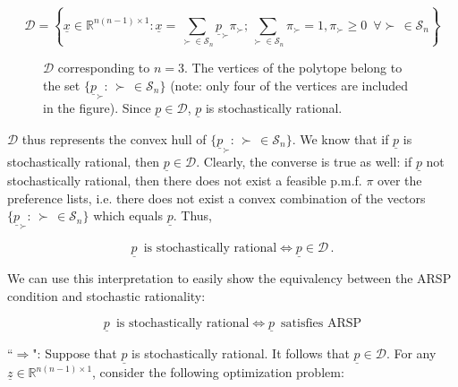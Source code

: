 \documentclass[11pt]{article}
\begin{document}
\begin{equation*}
\mathcal{D} = \left \{ \underline{x} \in \mathbb{R}^{n(n-1) \times 1} : \underline{x} = \sum_{\succ \in \mathcal{S}_n}\underline{p}_{\succ}  \pi_{\succ} ; \sum_{\succ \in \mathcal{S}_n} \pi_{\succ} = 1, \pi_{\succ} \geq 0 \, \, \, \forall  \succ \, \in \mathcal{S}_n \right \}
\end{equation*}

\begin{center}
\begin{figure}[h]
	\caption{$\mathcal{D}$ corresponding to $n=3$. The vertices of the polytope belong to the set $\{\underline{p}_{\succ} : \, \succ \, \in \mathcal{S}_n\}$ (note: only four of the vertices are included in the figure). Since $\underline{p} \in \mathcal{D}$, $\underline{p}$ is stochastically rational.}
\end{figure}
\end{center}



$\mathcal{D}$ thus represents the convex hull of  $\{\underline{p}_{\succ} : \, \succ \, \in \mathcal{S}_n\}$. We know that if $\underline{p}$ is stochastically rational, then $\underline{p} \in \mathcal{D}$. Clearly, the converse is true as well: if $\underline{p}$ not stochastically rational, then there does not exist a feasible p.m.f. $\pi$ over the preference lists, i.e. there does not exist a convex combination of the vectors $\{\underline{p}_{\succ} : \, \succ \, \in \mathcal{S}_n\}$ which equals $\underline{p}$. Thus,

\begin{equation*}
\underline{p} \, \, \, \text{is stochastically rational} \Leftrightarrow \underline{p} \in \mathcal{D} \, .
\end{equation*}

We can use this interpretation to easily show the equivalency between the ARSP condition and stochastic rationality:

\begin{equation*}
\underline{p} \, \, \, \text{is stochastically rational} \Leftrightarrow \underline{p} \, \, \, \text{satisfies ARSP}
\end{equation*}

``$\Rightarrow$": Suppose that $\underline{p}$ is stochastically rational. It follows that $\underline{p} \in \mathcal{D}$. For any $\underline{z} \in \mathbb{R}^{n(n-1) \times 1}$, consider the following optimization problem:
\end{document}

